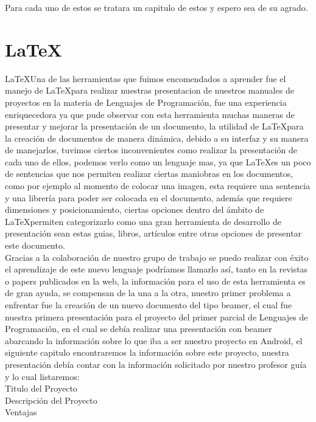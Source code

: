 \documentclass[12pt]{extbook}
\begin{document}
Para cada uno de estos se tratara un capitulo de estos y espero sea
de su agrado. 
\chapter{\LaTeX{}}
\LaTeX   Una de las herramientas que fuimos encomendados a aprender fue
el manejo de \LaTeX para realizar nuestras presentacion de nuestros
manuales de proyectos en la materia de Lenguajes de Programación,
fue una experiencia enriquecedora ya que pude observar con esta herramienta
muchas maneras de presentar y mejorar la presentación de un documento,
la utilidad de \LaTeX  para la creación de documentos de manera dinámica,
debido a su interfaz y su manera de manejarlos, tuvimos ciertos inconvenientes
como realizar la presentación de cada uno de ellos, podemos verlo
como un lenguaje mas, ya que  \LaTeX es un poco de sentencias que nos
permiten realizar ciertas maniobras en los documentos, como por ejemplo
al momento de colocar una imagen, esta requiere una sentencia y una
librería para poder ser colocada en el documento, además que requiere
dimensiones y posicionamiento, ciertas opciones dentro del ámbito
de \LaTeX permiten categorizarlo como una gran herramienta de desarrollo
de presentación sean estas guias, libros, artículos entre otras opciones
de presentar este documento.\\

Gracias a la colaboración de nuestro grupo de trabajo se puedo realizar
con éxito el aprendizaje de este nuevo lenguaje podríamos llamarlo
así, tanto en la revistas o papers publicados en la web, la información
para el uso de esta herramienta es de gran ayuda, se compensan de
la una a la otra, nuestro primer problema a enfrentar fue la creación
de un nuevo documento del tipo beamer, el cual fue nuestra primera
presentación para el proyecto del primer parcial de Lenguajes de Programación,
en el cual se debía realizar una presentación con beamer abarcando
la información sobre lo que iba a ser nuestro proyecto en Android,
el siguiente capitulo encontraremos la información sobre este proyecto,
nuestra presentación debía contar con la información solicitado por
nuestro profesor guía y lo cual listaremos:\\
 
\textbullet{} Titulo del Proyecto\\

\textbullet{} Descripción del Proyecto\\

\textbullet{} Ventajas\\
\end{document}
